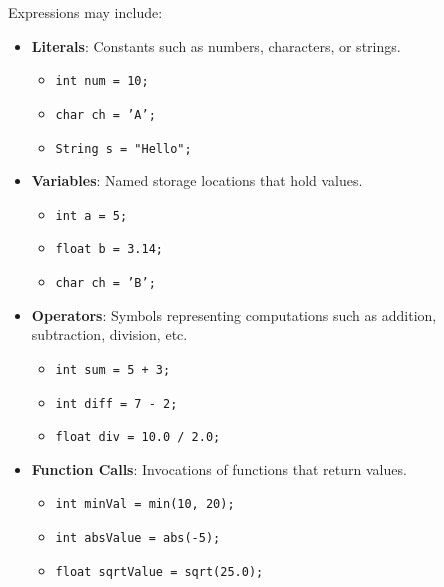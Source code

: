 \documentclass[11pt,A4]{article}
\begin{document}
        Expressions may include:
        \begin{itemize}
            \item \textbf{Literals}: Constants such as numbers, characters, or strings.
                \begin{itemize}
                    \item \texttt{int num = 10;}
                    \item \texttt{char ch = 'A';}
                    \item \texttt{String s = "Hello";}
                \end{itemize}
                
            \item \textbf{Variables}: Named storage locations that hold values.
                \begin{itemize}
                    \item \texttt{int a = 5;}
                    \item \texttt{float b = 3.14;}
                    \item \texttt{char ch = 'B';}
                \end{itemize}
                
            \item \textbf{Operators}: Symbols representing computations such as addition, subtraction, division, etc.
                \begin{itemize}
                    \item \texttt{int sum = 5 + 3;} 
                    \item \texttt{int diff = 7 - 2;}
                    \item \texttt{float div = 10.0 / 2.0;}
                \end{itemize}
                
            \item \textbf{Function Calls}: Invocations of functions that return values.
                \begin{itemize}
                    \item \texttt{int minVal = min(10, 20);}
                    \item \texttt{int absValue = abs(-5);}
                    \item \texttt{float sqrtValue = sqrt(25.0);}
                \end{itemize}
        \end{itemize}
\end{document}
